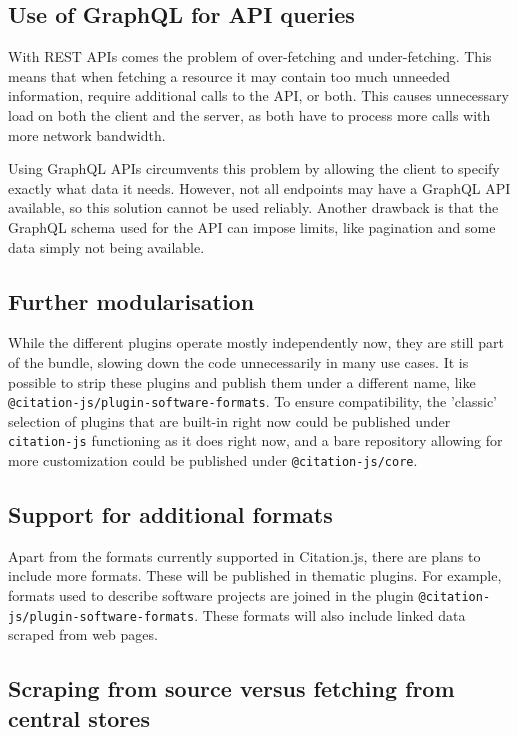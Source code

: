\documentclass[fleqn,10pt,lineno]{wlpeerj} %
\begin{document}
\subsection*{Use of GraphQL for API queries}

With REST APIs comes the problem of over-fetching and under-fetching. This means that when fetching a resource it may contain too much unneeded information, require additional calls to the API, or both. This causes unnecessary load on both the client and the server, as both have to process more calls with more network bandwidth.

Using GraphQL APIs circumvents this problem by allowing the client to specify exactly what data it needs. However, not all endpoints may have a GraphQL API available, so this solution cannot be used reliably. Another drawback is that the GraphQL schema used for the API can impose limits, like pagination and some data simply not being available.

\subsection*{Further modularisation}

While the different plugins operate mostly independently now, they are still part of the bundle, slowing down the code unnecessarily in many use cases. It is possible to strip these plugins and publish them under a different name, like \texttt{@citation-js/plugin-software-formats}. To ensure compatibility, the 'classic' selection of plugins that are built-in right now could be published under \texttt{citation-js} functioning as it does right now, and a bare repository allowing for more customization could be published under \texttt{@citation-js/core}.

\subsection*{Support for additional formats}

Apart from the formats currently supported in Citation.js, there are plans to include more formats. These will be published in thematic plugins. For example, formats used to describe software projects are joined in the plugin \texttt{@citation-js/plugin-software-formats}. These formats will also include linked data scraped from web pages.

\subsection*{Scraping from source versus fetching from central stores}
\end{document}
